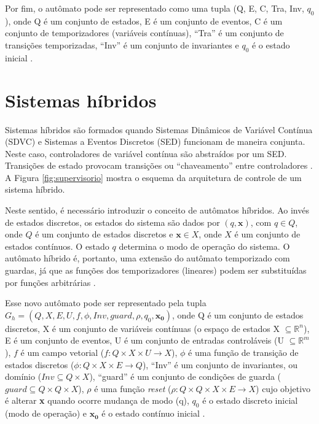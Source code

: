 Por fim, o autômato pode ser representado como uma tupla (Q, E, C, Tra, Inv,
$q_0$), onde Q é um conjunto de estados, E é um conjunto de eventos, C é um
conjunto de temporizadores (variáveis contínuas), ``Tra'' é um conjunto de
transições temporizadas, ``Inv'' é um conjunto de invariantes e $q_0$ é o
estado inicial \cite{book:SED}.

\section{Sistemas híbridos}

Sistemas híbridos são formados quando Sistemas Dinâmicos de Variável
Contínua (SDVC) e Sistemas a Eventos Discretos (SED) funcionam de maneira
conjunta. Neste caso, controladores de variável contínua são abstraídos
por um SED. Transições de estado provocam transições ou ``chaveamento'' entre
controladores \cite{book:SED}. A Figura \ref{fig:supervisorio} mostra o esquema
da arquitetura de controle de um sistema híbrido.

 

Neste sentido, é necessário introduzir o conceito de autômatos híbridos. Ao
invés de estados discretos, os estados do sistema são dados por
$(q,\mathbf{x})$, com $q \in Q$, onde $Q$ é um conjunto de estados discretos e
$\mathbf{x} \in X$, onde $X$ é um conjunto de estados contínuos. O estado $q$
determina o modo de operação do sistema. O autômato híbrido é, portanto, uma extensão do
autômato temporizado com guardas, já que as funções dos temporizadores
(lineares) podem ser substituídas por funções arbitrárias \cite{book:SED}.

Esse novo autômato pode ser representado pela tupla $G_h = (Q, X,
E, U, f, \phi, Inv, guard, \rho, q_0, \mathbf{x_0})$, onde Q é um conjunto de
estados discretos, X é um conjunto de variáveis contínuas (o espaço de estados
X $\subseteq \mathbb{R}^n$), E é um conjunto de eventos, U é um conjunto de
entradas controláveis (U $\subseteq \mathbb{R}^m$), $f$ é um campo vetorial
($f: Q \times X \times U \rightarrow X$), $\phi$ é uma função de transição de
estados discretos ($\phi: Q \times X \times E \rightarrow Q$), ``Inv'' é um
conjunto de invariantes, ou domínio ($Inv \subseteq Q \times X$), ``guard'' é um
conjunto de condições de guarda ($guard \subseteq Q \times Q \times X$), $\rho$
é uma função \textit{reset} ($\rho: Q \times Q \times X \times E \rightarrow
X$) cujo objetivo é alterar \textbf{x} quando ocorre mudança de modo (q), $q_0$
é o estado discreto inicial (modo de operação) e $\mathbf{x_0}$ é o estado
contínuo inicial \cite[pg. 316]{book:SED}.

